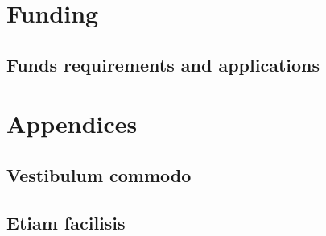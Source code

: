 
\part{Funding}
\newpage
\chapter{Funds requirements and applications} \label{ch:hendrerit}

\newpage



\part{Appendices}
\newpage
\chapter{Vestibulum commodo} \label{ch:commodo}

\newpage
\chapter{Etiam facilisis} \label{ch:etiam}

\newpage
\listoffigures
\listoftables
\newpage
\printbibliography[title = {Aliquam}]


